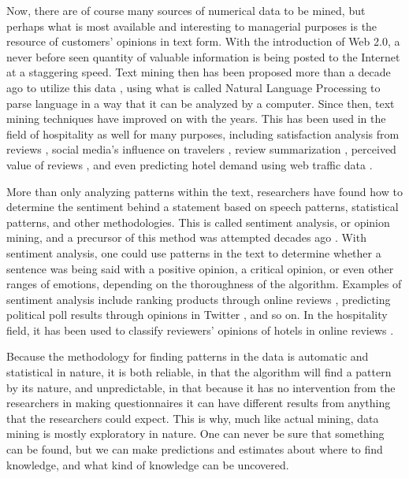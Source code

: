 Now, there are of course many sources of numerical data to be mined, but perhaps what is most available and interesting to managerial purposes is the resource of customers' opinions in text form. With the introduction of Web 2.0, a never before seen quantity of valuable information is being posted to the Internet at a staggering speed. Text mining then has been proposed more than a decade ago to utilize this data \cite[e.g.][]{rajman1998text,nahm2002text}, using what is called Natural Language Processing to parse language in a way that it can be analyzed by a computer. Since then, text mining techniques have improved on with the years. This has been used in the field of hospitality as well for many purposes, including satisfaction analysis from reviews \cite[e.g][]{berezina2016, xu2016, xiang2015, hargreaves2015, balbi2018}, social media's influence on travelers \cite[e.g.][]{xiang2010}, review summarization \cite[e.g.][]{hu2017436}, perceived value of reviews \cite[e.g][]{FANG2016498}, and even predicting hotel demand using web traffic data \cite[e.g][]{yang2014}.

More than only analyzing patterns within the text, researchers have found how to determine the sentiment behind a statement based on speech patterns, statistical patterns, and other methodologies. This is called sentiment analysis, or opinion mining, and a precursor of this method was attempted decades ago \cite[][]{stone1966general}. With sentiment analysis, one could use patterns in the text to determine whether a sentence was being said with a positive opinion, a critical opinion, or even other ranges of emotions, depending on the thoroughness of the algorithm. Examples of sentiment analysis include ranking products through online reviews \cite[e.g][]{liu2017149, zhang2011}, predicting political poll results through opinions in Twitter \cite[][]{oconnor2010}, and so on. In the hospitality field, it has been used to classify reviewers' opinions of hotels in online reviews \cite[e.g.]{kim2017362, alsmadi2018}. 

Because the methodology for finding patterns in the data is automatic and statistical in nature, it is both reliable, in that the algorithm will find a pattern by its nature, and unpredictable, in that because it has no intervention from the researchers in making questionnaires it can have different results from anything that the researchers could expect. This is why, much like actual mining, data mining is mostly exploratory in nature. One can never be sure that something can be found, but we can make predictions and estimates about where to find knowledge, and what kind of knowledge can be uncovered. 

